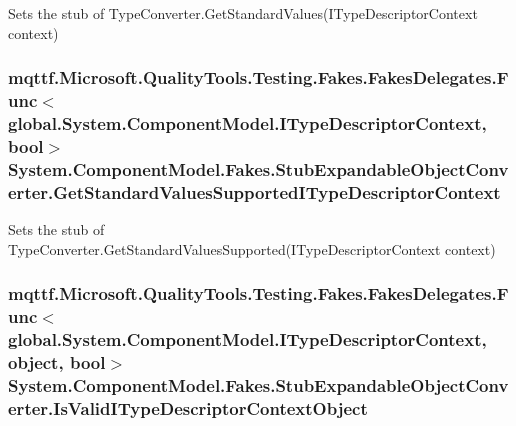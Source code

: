 Sets the stub of Type\-Converter.\-Get\-Standard\-Values(\-I\-Type\-Descriptor\-Context context)

\hypertarget{class_system_1_1_component_model_1_1_fakes_1_1_stub_expandable_object_converter_abd5b7aaa65547eb4946a27d30d37c3d4}{
\subsubsection[{Get\-Standard\-Values\-Supported\-I\-Type\-Descriptor\-Context}]{\setlength{\rightskip}{0pt plus 5cm}mqttf.\-Microsoft.\-Quality\-Tools.\-Testing.\-Fakes.\-Fakes\-Delegates.\-Func$<$global.\-System.\-Component\-Model.\-I\-Type\-Descriptor\-Context, bool$>$ System.\-Component\-Model.\-Fakes.\-Stub\-Expandable\-Object\-Converter.\-Get\-Standard\-Values\-Supported\-I\-Type\-Descriptor\-Context}}\label{class_system_1_1_component_model_1_1_fakes_1_1_stub_expandable_object_converter_abd5b7aaa65547eb4946a27d30d37c3d4}


Sets the stub of Type\-Converter.\-Get\-Standard\-Values\-Supported(\-I\-Type\-Descriptor\-Context context)

\hypertarget{class_system_1_1_component_model_1_1_fakes_1_1_stub_expandable_object_converter_adf4a1e64fe918289b8f58394c55df268}{
\subsubsection[{Is\-Valid\-I\-Type\-Descriptor\-Context\-Object}]{\setlength{\rightskip}{0pt plus 5cm}mqttf.\-Microsoft.\-Quality\-Tools.\-Testing.\-Fakes.\-Fakes\-Delegates.\-Func$<$global.\-System.\-Component\-Model.\-I\-Type\-Descriptor\-Context, object, bool$>$ System.\-Component\-Model.\-Fakes.\-Stub\-Expandable\-Object\-Converter.\-Is\-Valid\-I\-Type\-Descriptor\-Context\-Object}}\label{class_system_1_1_component_model_1_1_fakes_1_1_stub_expandable_object_converter_adf4a1e64fe918289b8f58394c55df268}


